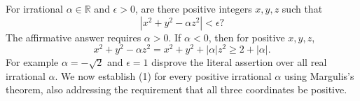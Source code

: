 For irrational $\alpha\in\mathbb R$ and $\epsilon>0$, are there positive integers $x,y,z$ such that
\[|x^2+y^2-\alpha z^2|<\epsilon?\tag{1}\]
The affirmative answer requires $\alpha>0$. If $\alpha<0$, then for positive $x,y,z$,
\[x^2+y^2-\alpha z^2=x^2+y^2+|\alpha|z^2\ge2+|\alpha|.\]
For example $\alpha=-\sqrt2$ and $\epsilon=1$ disprove the literal assertion over all real irrational $\alpha$. We now establish (1) for every positive irrational $\alpha$ using Margulis's theorem, also addressing the requirement that all three coordinates be positive.
